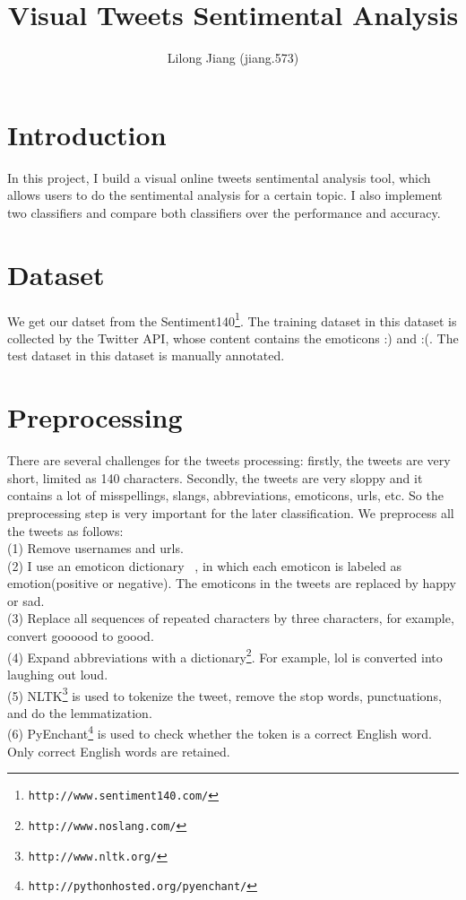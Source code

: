 \documentclass{article}
\begin{document}
\title{Visual Tweets Sentimental Analysis}
\author{Lilong Jiang (jiang.573)}
\maketitle

\section{Introduction}
In this project, I build a visual online tweets sentimental analysis tool, which allows users to do the sentimental analysis for a certain topic. I also implement two classifiers and compare both classifiers over the performance and accuracy. 
\section{Dataset}
We get our datset from the Sentiment140\footnote{\texttt{\scriptsize{http://www.sentiment140.com/‎}}}. The training dataset in this dataset is collected by the Twitter API, whose content contains the emoticons :) and :(. The test dataset in this dataset is manually annotated.
\section{Preprocessing}
There are several challenges for the tweets processing: firstly, the tweets are very short, limited as 140 characters. Secondly, the tweets are very sloppy and it contains a lot of misspellings, slangs, abbreviations, emoticons, urls, etc. So the preprocessing step is very important for the later classification.
We preprocess all the tweets as follows: \\
(1) Remove usernames and urls. \\
(2) I use an emoticon dictionary ~\cite{agarwal2011sentiment}, in which each emoticon is labeled as emotion(positive or negative). The emoticons in the tweets are replaced by happy or sad. \\
(3) Replace all sequences of repeated characters by three characters, for example, convert goooood to goood.\\
(4) Expand abbreviations with a dictionary\footnote{\texttt{\scriptsize{http://www.noslang.com/‎‎}}}. For example, lol is converted into laughing out loud. \\
(5) NLTK\footnote{\texttt{\scriptsize{http://www.nltk.org/‎‎}}} is used to tokenize the tweet, remove the stop words, punctuations, and do the lemmatization. \\
(6) PyEnchant\footnote{\texttt{\scriptsize{http://pythonhosted.org/pyenchant/‎‎}}} is used to check whether the token is a correct English word. Only correct English words are retained.\\ 
\end{document}
